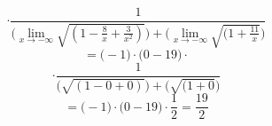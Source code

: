 \documentclass{article}
\begin{document}
\begin{equation*}
    \cdot \frac{1}{\Big(\lim_{x \to -\infty} \sqrt{(1 - \frac{8}{x} + \frac{3}{x^2})}\Big) + \Big(\lim_{x \to -\infty} \sqrt{(1 + \frac{11}{x}}\Big)}
\end{equation*}
\begin{equation*}
    = \Bigg(-1 \Bigg) \cdot \Bigg( 0 - 19 \Bigg) \cdot
\end{equation*}
\begin{equation*}
    \cdot \frac{1}{\Big( \sqrt{(1 - 0 + 0)}\Big) + \Big(\sqrt{(1 + 0}\Big)}
\end{equation*}
\begin{equation*}
    = \Bigg(-1 \Bigg) \cdot \Bigg( 0 - 19 \Bigg) \cdot \frac{1}{2} = \frac{19}{2}
\end{equation*}
\end{document}
